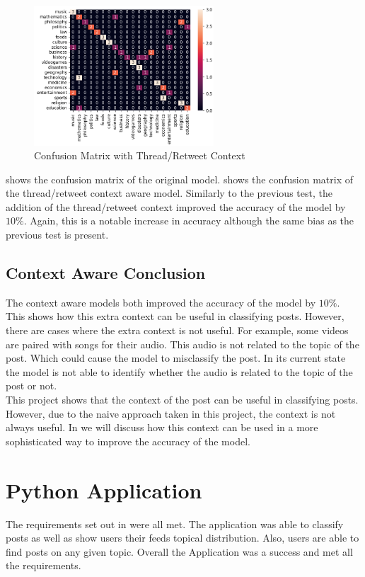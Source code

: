 \begin{figure}[hbtp]
    \centering
    \includegraphics[width=0.6\textwidth]{../images/confusion/RoBERTa-thread-20.png}
    \caption{Confusion Matrix with Thread/Retweet Context}
    \label{fig:retweet}
\end{figure}

 shows the confusion matrix of the original model.  shows the confusion matrix of the
thread/retweet context aware model. Similarly to the previous test, the addition of the thread/retweet context improved the accuracy of
the model by $10\%$. Again, this is a notable increase in accuracy although the same bias as the previous test is present.

\subsection{Context Aware Conclusion}
The context aware models both improved the accuracy of the model by $10\%$. This shows how this extra context can be useful in
classifying posts. However, there are cases where the extra context is not useful. For example, some videos are paired with songs for
their audio. This audio is not related to the topic of the post. Which could cause the model to misclassify the post. In its current state
the model is not able to identify whether the audio is related to the topic of the post or not.\\
This project shows that the context of the post can be useful in classifying posts. However, due to the naive approach taken
in this project, the context is not always useful. In  we will discuss how this context can be used in a more
sophisticated way to improve the accuracy of the model.

\section{Python Application}
The requirements set out in  were all met. The application was able to classify posts as well as show
users their feeds topical distribution. Also, users are able to find posts on any given topic. Overall the Application
was a success and met all the requirements.
